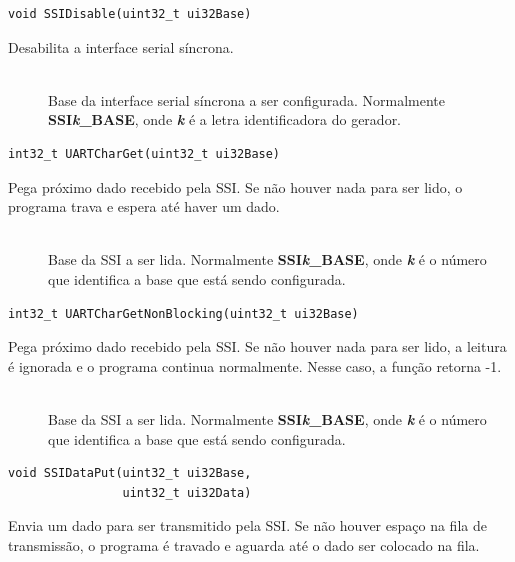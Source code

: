 \begin{lstlisting}[style=funcao]
	void SSIDisable(uint32_t ui32Base)
\end{lstlisting}

Desabilita a interface serial síncrona.

\begin{description}
	\item []\hfill \\
	Base da interface serial síncrona a ser configurada. Normalmente \textbf{SSI\emph{k}\_BASE}, onde \textbf{\emph{k}} é a letra identificadora do gerador.
\end{description}

\begin{lstlisting}[style=funcao]
	int32_t UARTCharGet(uint32_t ui32Base)
\end{lstlisting}

Pega próximo dado recebido pela SSI. Se não houver nada para ser lido, o programa trava e espera até haver um dado.

\begin{description}
	\item []\hfill \\
	Base da SSI a ser lida. Normalmente \textbf{SSI\emph{k}\_BASE}, onde \textbf{\emph{k}} é o número que identifica a base que está sendo configurada.
\end{description}

\begin{lstlisting}[style=funcao]
	int32_t UARTCharGetNonBlocking(uint32_t ui32Base)
\end{lstlisting}

Pega próximo dado recebido pela SSI. Se não houver nada para ser lido, a leitura é ignorada e o programa continua normalmente. Nesse caso, a função retorna -1.

\begin{description}
	\item []\hfill \\
	Base da SSI a ser lida. Normalmente \textbf{SSI\emph{k}\_BASE}, onde \textbf{\emph{k}} é o número que identifica a base que está sendo configurada.
\end{description}

\begin{lstlisting}[style=funcao]
	void SSIDataPut(uint32_t ui32Base,
				uint32_t ui32Data)
\end{lstlisting}

Envia um dado para ser transmitido pela SSI. Se não houver espaço na fila de transmissão, o programa é travado e aguarda até o dado ser colocado na fila.

